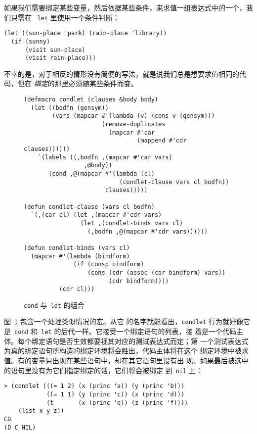 如果我们需要绑定某些变量，然后依据某些条件，来求值一组表达式中的一个，我们只需在
~\texttt{let} 里使用一个条件判断：
\begin{lstlisting}
(let ((sun-place 'park) (rain-place 'library))
  (if (sunny)
      (visit sun-place)
      (visit rain-place)))
\end{lstlisting}
不幸的是，对于相反的情形没有简便的写法，就是说我们总是想要求值相同的代码，但在
\emph{绑定}的那里必须随某些条件而变。

\begin{figure}
\begin{lstlisting}
(defmacro condlet (clauses &body body)
  (let ((bodfn (gensym))
        (vars (mapcar #'(lambda (v) (cons v (gensym)))
                      (remove-duplicates
                        (mapcar #'car
                                (mappend #'cdr clauses))))))
    `(labels ((,bodfn ,(mapcar #'car vars)
                 ,@body))
       (cond ,@(mapcar #'(lambda (cl)
                           (condlet-clause vars cl bodfn))
                       clauses)))))

(defun condlet-clause (vars cl bodfn)
  `(,(car cl) (let ,(mapcar #'cdr vars)
                (let ,(condlet-binds vars cl)
                  (,bodfn ,@(mapcar #'cdr vars))))))

(defun condlet-binds (vars cl)
  (mapcar #'(lambda (bindform)
              (if (consp bindform)
                  (cons (cdr (assoc (car bindform) vars))
                        (cdr bindform))))
          (cdr cl)))
\end{lstlisting}
  \caption{\texttt{cond} 与~\texttt{let} 的组合}
  \label{fig:combination_of_cond_and_let}
\end{figure}

图~\ref{fig:combination_of_cond_and_let} 包含一个处理类似情况的宏。从它
的名字就能看出，\texttt{condlet} 行为就好像它
是~\texttt{cond} 和~\texttt{let} 的后代一样。它接受一个绑定语句的列表，接
着是一个代码主体。每个绑定语句是否生效都要视其对应的测试表达式而定；第
一个测试表达式为真的绑定语句所构造的绑定环境将会胜出，代码主体将在这个
绑定环境中被求值。有的变量只出现在某些语句中，却在其它语句里没有出
现，如果最后被选中的语句里没有为它们指定绑定的话，它们将会被绑定
到~\texttt{nil} 上：
\begin{lstlisting}
> (condlet (((= 1 2) (x (princ 'a)) (y (princ 'b)))
            ((= 1 1) (y (princ 'c)) (x (princ 'd)))
            (t       (x (princ 'e)) (z (princ 'f))))
    (list x y z))
CD
(D C NIL)
\end{lstlisting}

